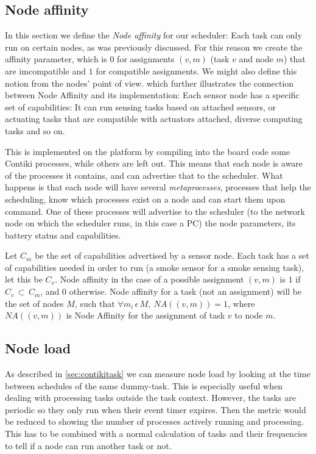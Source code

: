 \subsection{Node affinity}

In this section we define the \textit{Node affinity} for our scheduler: Each task can only run on certain nodes, as was previously discussed. 
For this reason we create the affinity parameter, which is $0$ for assignments $(v,m)$ (task $v$ and node $m$) 
that are imcompatible and $1$ for compatible assignments.
We might also define this notion from the nodes' point of view. which further illustrates the connection between Node Affinity and its implementation:
Each sensor node has a specific set of capabilities: It can run sensing tasks based on attached sensors, or actuating tasks that are compatible with
actuators attached, diverse computing tasks and so on. 

This is implemented on the platform by compiling into the board code some Contiki processes, while others
are left out. This means that each node is aware of the processes it contains, and can advertise that to the scheduler. What happens is that each node
will have several \textit{metaprocesses}, processes that help the scheduling, know which processes exist on a node and can start them upon command.
One of these processes will advertise to the scheduler (to the network node on which the scheduler runs, in this case a PC) the node parameters,
its battery status and capabilities.

Let $C_m$ be the set of capabilities advertised by a sensor node. Each task has a set of capabilities needed in order to run (a smoke sensor for a smoke
sensing task), let this be $C_v$. Node affinity in the case of a possible assignment $(v,m)$ is $1$ if $C_v\, \subset\,C_m$, and $0$ otherwise. Node affinity
for a task (not an assignment) will be the set of nodes $M$, such that $\forall m_i\,\epsilon\,M,\: NA((v,m))=1$, where $NA((v,m))$ is Node Affinity for
the assignment of task $v$ to node $m$.


\subsection{Node load}
\label{sec:nodeload}


As described in \ref{sec:contikitask} we can measure node load by looking at the time between schedules of the same dummy-task. This is especially
useful when dealing with processing tasks outside the task context. However, the tasks are periodic so they only run when their event timer expires.
Then the metric would be reduced to showing the number of processes actively running and processing. This has to be combined with a normal calculation
of tasks and their frequencies to tell if a node can run another task or not.


